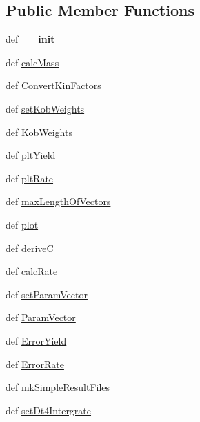 \subsection*{\-Public \-Member \-Functions}
\begin{DoxyCompactItemize}
\item 
\hypertarget{classModels_1_1KobayashiA2_a5a22e7f37b899751b8611a3f06c988f2}{def {\bfseries \-\_\-\-\_\-init\-\_\-\-\_\-}}\label{classModels_1_1KobayashiA2_a5a22e7f37b899751b8611a3f06c988f2}

\item 
def \hyperlink{classModels_1_1KobayashiA2_a7fc4650e426fa4b341795d9508176ea3}{calc\-Mass}
\item 
def \hyperlink{classModels_1_1KobayashiA2_a29386cb0487ceb6ff432468a20d12c81}{\-Convert\-Kin\-Factors}
\item 
def \hyperlink{classModels_1_1KobayashiA2_ade04a3424cfd823d7cd5e2b99abcbc46}{set\-Kob\-Weights}
\item 
def \hyperlink{classModels_1_1KobayashiA2_aa4302551de83a7fdc46d1e73d1ea4a27}{\-Kob\-Weights}
\item 
def \hyperlink{classModels_1_1Model_a317ed848b969dbe3a96dd05e8b771900}{plt\-Yield}
\item 
def \hyperlink{classModels_1_1Model_aa35c741babf8f141df48c4021e0664e4}{plt\-Rate}
\item 
def \hyperlink{classModels_1_1Model_a3396d6ca1a7b7d66e55ada8c3c7a509e}{max\-Length\-Of\-Vectors}
\item 
def \hyperlink{classModels_1_1Model_ae404a691e48bfe4eafcdfdd09f1dae48}{plot}
\item 
def \hyperlink{classModels_1_1Model_a010945ed2adff59a7a5fce36025e7a97}{derive\-C}
\item 
def \hyperlink{classModels_1_1Model_a7c9280e33f9e0d46703cebc131008c65}{calc\-Rate}
\item 
def \hyperlink{classModels_1_1Model_a818f207e2a4bd0e9a3720ca611960e5a}{set\-Param\-Vector}
\item 
def \hyperlink{classModels_1_1Model_a13c76a0fe24d43cdc4d21fbc73fa96fa}{\-Param\-Vector}
\item 
def \hyperlink{classModels_1_1Model_ad3e627980d9e781bf7b2c9ff900ca06b}{\-Error\-Yield}
\item 
def \hyperlink{classModels_1_1Model_a3050eb39341f318d8d88b172f88bd240}{\-Error\-Rate}
\item 
def \hyperlink{classModels_1_1Model_adcb987bccae63a742490ea1e6d5f7a74}{mk\-Simple\-Result\-Files}
\item 
def \hyperlink{classModels_1_1Model_ac28252ae5cd6b5ecd4c5d006a0e6567d}{set\-Dt4\-Intergrate}
\end{DoxyCompactItemize}
